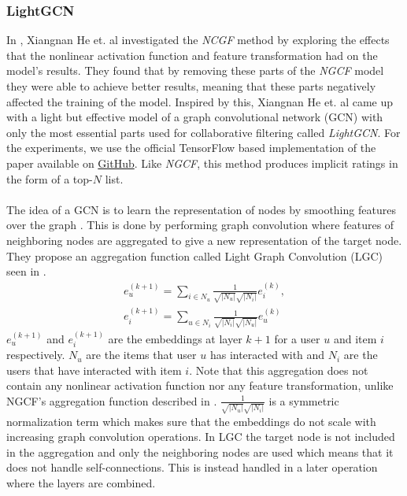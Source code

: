 \subsubsection{LightGCN}
In \cite{LightGCN}, Xiangnan He et. al investigated the \textit{NCGF} method by exploring the effects that the nonlinear activation function and feature transformation had on the model's results.
They found that by removing these parts of the \textit{NGCF} model they were able to achieve better results, meaning that these parts negatively affected the training of the model.
Inspired by this, Xiangnan He et. al came up with a light but effective model of a graph convolutional network (GCN) with only the most essential parts used for collaborative filtering called \textit{LightGCN}.
For the experiments, we use the official TensorFlow based implementation of the paper available on \href{https://github.com/kuandeng/LightGCN}{GitHub}.
Like \textit{NGCF}, this method produces implicit ratings in the form of a top-$N$ list.
\\\\
The idea of a GCN is to learn the representation of nodes by smoothing features over the graph \cite{LightGCN}.
This is done by performing graph convolution where features of neighboring nodes are aggregated to give a new representation of the target node.
They propose an aggregation function called Light Graph Convolution (LGC) seen in .
\begin{align}\label{eqn:lgc}
    e_{u}^{(k+1)}=\sum_{i\in N_u}\frac{1}{\sqrt{\left | N_u \right |}\sqrt{\left | N_i \right |}}e_{i}^{(k)},\nonumber\\
    e_{i}^{(k+1)}=\sum_{u\in N_i}\frac{1}{\sqrt{\left | N_i \right |}\sqrt{\left | N_u \right |}}e_{u}^{(k)}
\end{align}
$e_{u}^{(k+1)}$ and $e_{i}^{(k+1)}$ are the embeddings at layer $k+1$ for a user $u$ and item $i$ respectively.
$N_u$ are the items that user $u$ has interacted with and $N_i$ are the users that have interacted with item $i$.
Note that this aggregation does not contain any nonlinear activation function nor any feature transformation, unlike NGCF's aggregation function described in .
$\frac{1}{\sqrt{\left | N_u \right |}\sqrt{\left | N_i \right |}}$ is a symmetric normalization term which makes sure that the embeddings do not scale with increasing graph convolution operations.
In LGC the target node is not included in the aggregation and only the neighboring nodes are used which means that it does not handle self-connections.
This is instead handled in a later operation where the layers are combined.
